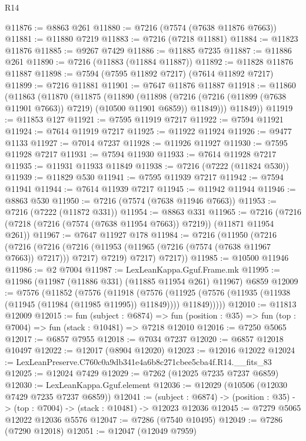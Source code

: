\begin{lexlean}{R14}
\begin{coremodule}
@11876 := @8863 @261
@11880 := @7216 (@7574 (@7638 @11876 @7663))
@11881 := @11880 @7219
@11883 := @7216 (@7218 @11881)
@11884 := @11823 @11876
@11885 := @9267 @7429
@11886 := @11885 @7235
@11887 := @11886 @261
@11890 := @7216 (@11883 (@11884 @11887))
@11892 := @11828 @11876 @11887
@11898 := @7594 (@7595 @11892 @7217) (@7614 @11892 @7217)
@11899 := @7216 @11881
@11901 := @7647 @11876 @11887
@11918 := @11860
    (@11863
      (@11870
        (@11875
          (@11890
            (@11898
              (@7216 (@7216 (@11899 (@7638 @11901 @7663)) @7219) (@10500 @11901 @6859))
              @11849)))
        @11849))
@11919 := @11853 @127
@11921 := @7595 @11919 @7217
@11922 := @7594 @11921
@11924 := @7614 @11919 @7217
@11925 := @11922 @11924
@11926 := @9477 @1133
@11927 := @7014 @7237
@11928 := @11926 @11927
@11930 := @7595 @11928 @7217
@11931 := @7594 @11930
@11933 := @7614 @11928 @7217
@11935 := @11931 @11933 @11849
@11938 := @7216 (@7222 (@11824 @530))
@11939 := @11829 @530
@11941 := @7595 @11939 @7217
@11942 := @7594 @11941
@11944 := @7614 @11939 @7217
@11945 := @11942 @11944
@11946 := @8863 @530
@11950 := @7216 (@7574 (@7638 @11946 @7663))
@11953 := @7216 (@7222 (@11872 @331))
@11954 := @8863 @331
@11965 := @7216 (@7216 (@7218 (@7216 (@7574 (@7638 @11954 @7663)) @7219)) (@11871 @11954 @261))
@11967 := @7647 @11927 @178
@11984 := @7216
    (@11950
      (@7216
        (@7216
          (@7216 (@7216 (@11953 (@11965 (@7216 (@7574 (@7638 @11967 @7663)) @7217))) @7217) @7219)
          @7217)
        @7217))
@11985 := @10500 @11946
@11986 := @2 @7004
@11987 := LexLeanKappa.Gguf.Frame.mk
@11995 := @11986 (@11987 (@11886 @331) (@11885 @11954 @261) @11967) @6859
@12009 := @7576
    (@11852
      (@7576
        (@11918
          (@7576
            (@11925 (@7576 (@11935 (@11938 (@11945 (@11984 (@11985 @11995)) @11849)))) @11849)))))
@12010 := @11813 @12009
@12015 := fun (subject : @6874) =>
  fun (position : @35) => fun (top : @7004) => fun (stack : @10481) => @7218 @12010
@12016 := @7250 @5065
@12017 := @6857 @7955
@12018 := @7034 @7237
@12020 := @6857 @12018 @10497
@12022 := @12017 (@8904 @12020)
@12023 := @12016 @12022
@12024 := LexLeanPreserve.C760c0a9db341e4a6b8c271cbee5cba4f.R14.__fits_83
@12025 := @12024 @7429
@12029 := @7262 (@12025 @7235 @7237 @6859)
@12030 := LexLeanKappa.Gguf.element
@12036 := @12029 (@10506 (@12030 @7429 @7235 @7237 @6859))
@12041 := (subject : @6874) ->
  (position : @35) -> (top : @7004) -> (stack : @10481) -> @12023 @12036
@12045 := @7279 @5065 @12022 @12036 @5576
@12047 := @7286 (@7540 @10495)
@12049 := @7286 (@7290 @12018)
@12051 := @12047 (@12049 @7959)

\end{coremodule}
\end{lexlean}

